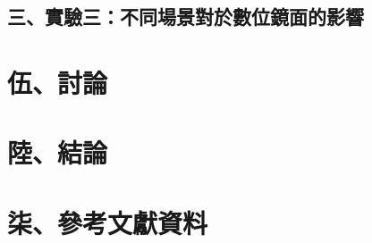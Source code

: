 \documentclass[12pt]{article}
\begin{document}
\subsection{三、實驗三：不同場景對於數位鏡面的影響}

\newpage
\section{伍、討論}

\newpage
\section{陸、結論}

\newpage
\section{柒、參考文獻資料}



\end{document}
